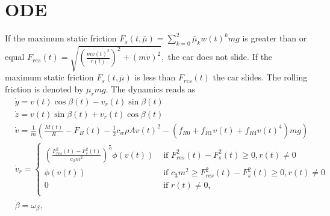 \documentclass[
10pt, %
a4paper, %
oneside, %
headinclude,footinclude, %
BCOR5mm, %
]{scrartcl}
\begin{document}
\section{ODE}
If the maximum static friction $F_s(t, \bar{\mu}) = \sum_{k=0}^2 \bar{\mu}_k w(t)^k mg $ is greater than or equal $F_{res}(t) = \sqrt{\left(\frac{mv(t)^2}{r(t)}\right)^2+ \left(m \dot{v}\right)^2},$ the car does not slide. 
If the maximum static friction $F_s(t, \bar{\mu})$ is less than $F_{res}(t)$ the car slides. The rolling friction is denoted by $\mu_r m g.$
The dynamics reads as
\begin{align*}
 &\dot{y} = v(t) \cos\beta(t) -  v_r(t)\sin \beta(t) \\
& \dot{z} = v(t) \sin\beta(t) +  v_r(t)\cos \beta(t) \\
& \dot{v} = \frac{1}{m}\left( \frac{M(t)}{R} - F_B(t) - \frac{1}{2}  c_w  \rho  A v(t)^2 -\left(f_{R0} + f_{R1} v(t) + f_{R4}v(t)^4 \right) m g\right)\\
&  \dot{v}_r = \begin{cases} \left(\frac{F_{res}^2(t)- F_{s}^2(t)}{c_3m^2}\right)^5 \phi(v(t)) & \text{ if } F_{res}^2(t)- F_{s}^2(t)\geq 0, r(t) \neq 0\\
\phi( v(t))  & \text{ if } c_3m^2 \geq F_{res}^2(t)- F_{s}^2(t) \geq 0, r(t) \neq 0\\
0 &   \text{ if } r(t) \neq 0,\\
\end{cases}\\
& \dot{\beta} = \omega_{\beta},
\end{align*}
\end{document}
